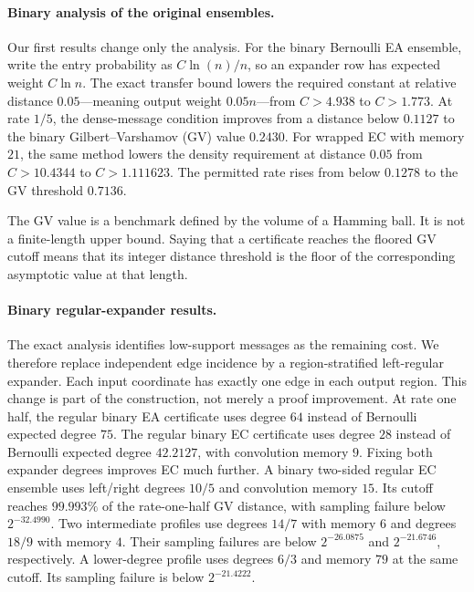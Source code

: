 \paragraph{Binary analysis of the original ensembles.}
Our first results change only the analysis.  For the binary Bernoulli EA
ensemble, write the entry probability as $C\ln(n)/n$, so an expander row has
expected weight $C\ln n$.  The exact transfer bound lowers the required
constant at relative distance $0.05$---meaning output weight $0.05n$---from
$C>4.938$ to $C>1.773$.  At rate $1/5$, the
dense-message condition improves from a distance below $0.1127$ to the binary
Gilbert--Varshamov (GV) value $0.2430$.  For wrapped EC with memory $21$, the
same method lowers the density requirement at distance $0.05$ from
$C>10.4344$ to $C>1.111623$.  The permitted rate rises from below $0.1278$ to
the GV threshold $0.7136$.

The GV value is a benchmark defined by the volume of a Hamming ball.  It is
not a finite-length upper bound.  Saying that a certificate reaches the
floored GV cutoff means that its integer distance threshold is the floor of
the corresponding asymptotic value at that length.

\paragraph{Binary regular-expander results.}
The exact analysis identifies low-support messages as the remaining cost.
We therefore replace independent edge incidence by a region-stratified
left-regular expander.  Each input coordinate has exactly one edge in each
output region.  This change is part of the construction, not merely a proof
improvement.  At rate one half, the regular binary EA certificate uses degree
$64$ instead of Bernoulli expected degree $75$.  The regular binary EC
certificate uses degree $28$ instead of Bernoulli expected degree $42.2127$,
with convolution memory $9$.  Fixing both expander degrees improves EC much
further.  A binary two-sided regular EC ensemble uses left/right degrees
$10/5$ and convolution memory $15$.  Its cutoff reaches $99.993\%$ of the
rate-one-half GV distance, with sampling failure below $2^{-32.4990}$.
Two intermediate profiles use degrees $14/7$ with memory $6$ and degrees
$18/9$ with memory $4$.  Their sampling failures are below $2^{-26.0875}$
and $2^{-21.6746}$, respectively.
A lower-degree profile uses degrees $6/3$ and memory $79$ at the same cutoff.
Its sampling failure is below $2^{-21.4222}$.


